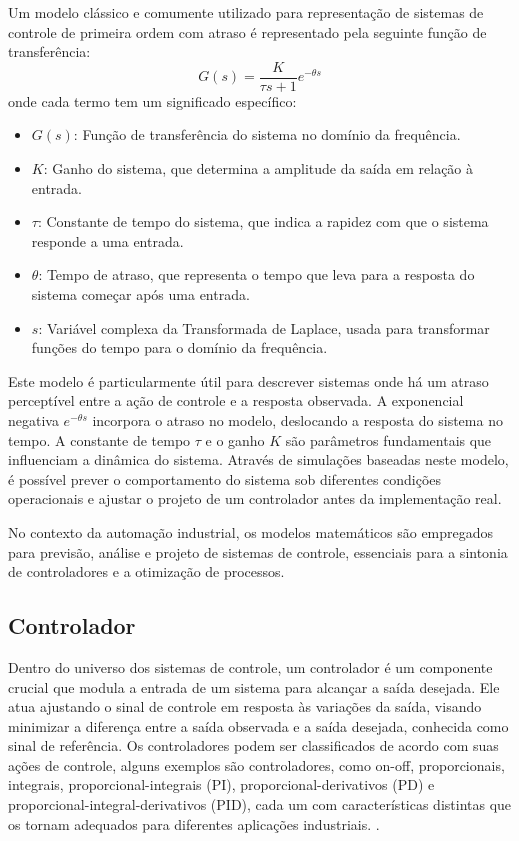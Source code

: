 Um modelo clássico e comumente utilizado para representação de sistemas de controle de primeira ordem com atraso é
representado pela seguinte função de transferência:
\begin{equation}
\label{eq:first_order_tf}
G(s) = \frac{K}{\tau s + 1}e^{-\theta s}
\end{equation}
onde cada termo tem um significado específico:
\begin{itemize}
\item $G(s)$: Função de transferência do sistema no domínio da frequência.
\item $K$: Ganho do sistema, que determina a amplitude da saída em relação à entrada.
\item $\tau$: Constante de tempo do sistema, que indica a rapidez com que o sistema responde a uma entrada.
\item $\theta$: Tempo de atraso, que representa o tempo que leva para a resposta do sistema começar após uma entrada.
\item $s$: Variável complexa da Transformada de Laplace, usada para transformar funções do tempo para o domínio da frequência.
\end{itemize}

Este modelo é particularmente útil para descrever sistemas onde há um atraso perceptível entre a ação de controle e a
resposta observada.
A exponencial negativa \( e^{-\theta s} \) incorpora o atraso no modelo, deslocando a resposta do sistema no tempo.
A constante de tempo \( \tau \) e o ganho \( K \) são parâmetros fundamentais que influenciam a dinâmica do sistema.
Através de simulações baseadas neste modelo, é possível prever o comportamento do sistema sob diferentes
condições operacionais e ajustar o projeto de um controlador antes da implementação real.

No contexto da automação industrial, os modelos matemáticos são empregados para previsão, análise e projeto de sistemas
de controle, essenciais para a sintonia de controladores e a otimização de processos.

\subsection{Controlador}

Dentro do universo dos sistemas de controle, um controlador é um componente crucial que modula a entrada de um sistema
para alcançar a saída desejada.
Ele atua ajustando o sinal de controle em resposta às variações da saída, visando minimizar a diferença entre a saída
observada e a saída desejada, conhecida como sinal de referência.
Os controladores podem ser classificados de acordo com suas ações de controle, alguns exemplos são controladores,
como on-off, proporcionais, integrais, proporcional-integrais (PI), proporcional-derivativos (PD) e
proporcional-integral-derivativos (PID), cada um com características distintas que os tornam adequados para diferentes
aplicações industriais. \cite[Cap 2.3]{ogata2010engenharia}.

